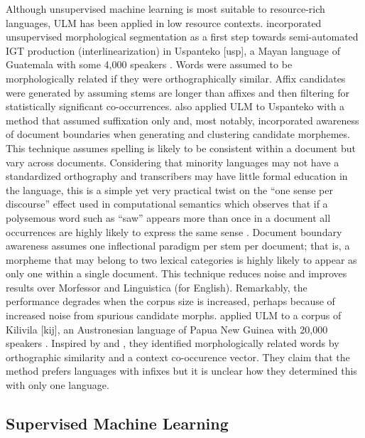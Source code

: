 \documentclass[12pt]{article}
\begin{document}
Although unsupervised machine learning is most suitable to resource-rich languages, ULM has been applied in low resource contexts.  incorporated unsupervised morphological segmentation as a first step towards semi-automated IGT production (interlinearization) in Uspanteko [usp], a Mayan language of Guatemala with some 4,000 speakers \cite{simons_ethnologue:_2018}. Words were assumed to be morphologically related if they were orthographically similar. Affix candidates were generated by assuming stems are longer than affixes and then filtering for statistically significant co-occurrences.  also applied ULM to Uspanteko with a method that assumed suffixation only and, most notably, incorporated awareness of document boundaries when generating and clustering candidate morphemes. This technique assumes spelling is likely to be consistent within a document but vary across documents. Considering that minority languages may not have a standardized orthography and transcribers may have little formal education in the language, this is a simple yet very practical twist on the “one sense per discourse” effect used in computational semantics which observes that if a polysemous word such as ``saw'' appears more than once in a document all occurrences are highly likely to express the same sense \cite{gale_one_1992}. Document boundary awareness assumes one inflectional paradigm per stem per document; that is, a morpheme that may belong to two lexical categories is highly likely to appear as only one within a single document. This technique reduces noise and improves results over Morfessor and Linguistica (for English). Remarkably, the performance degrades when the corpus size is increased, perhaps because of increased noise from spurious candidate morphs.  applied ULM to a corpus of Kilivila [kij], an Austronesian language of Papua New Guinea with 20,000 speakers \cite{simons_ethnologue:_2018}. Inspired by  and , they identified morphologically related words by orthographic similarity and a context co-occurence vector. They claim that the method prefers languages with infixes but it is unclear how they determined this with only one language. 

\subsection{Supervised Machine Learning}
\label{sec:supervised}
\end{document}
